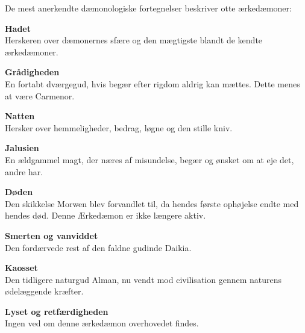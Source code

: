 \documentclass[a4paper,12pt]{memoir}
\begin{document}
\begin{tcolorbox}[
  title={\sffamily\bfseries DE OTTE KENDTE},
  coltitle=white,
  colbacktitle=black,
  colback=black!3,
  colframe=black,
  boxrule=0.8pt,
  sharp corners,
  fontupper=\small,
  left=4mm,
  right=4mm,
  top=3mm,
  bottom=3mm
]

De mest anerkendte dæmonologiske fortegnelser beskriver
otte ærkedæmoner:

\par\smallskip

\noindent
\textbf{Hadet}\\
Herskeren over dæmonernes sfære og den mægtigste blandt
de kendte ærkedæmoner.

\par\smallskip

\noindent
\textbf{Grådigheden}\\
En fortabt dværgegud, hvis begær efter rigdom aldrig kan
mættes. Dette menes at være Carmenor.

\par\smallskip

\noindent
\textbf{Natten}\\
Hersker over hemmeligheder, bedrag, løgne og den stille kniv.

\par\smallskip

\noindent
\textbf{Jalusien}\\
En ældgammel magt, der næres af misundelse, begær og
ønsket om at eje det, andre har.

\par\smallskip

\noindent
\textbf{Døden}\\
Den skikkelse Morwen blev forvandlet til, da hendes første
ophøjelse endte med hendes død. Denne Ærkedæmon er ikke længere aktiv.

\par\smallskip

\noindent
\textbf{Smerten og vanviddet}\\
Den fordærvede rest af den faldne gudinde Daikia.

\par\smallskip

\noindent
\textbf{Kaosset}\\
Den tidligere naturgud Alman, nu vendt mod civilisation
gennem naturens ødelæggende kræfter.

\par\smallskip

\noindent
\textbf{Lyset og retfærdigheden}\\
Ingen ved om denne ærkedæmon overhovedet findes.

\end{tcolorbox}
\end{document}

